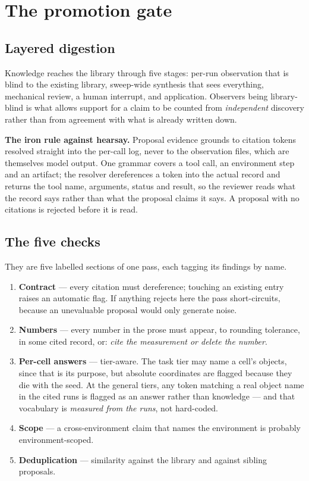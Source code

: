 \documentclass[11pt,a4paper]{report}
\newcommand{\keyrule}[1]{\textbf{\textcolor{acc}{#1}}}
\begin{document}
\chapter{The promotion gate}

\section{Layered digestion}

Knowledge reaches the library through five stages: per-run observation that is
blind to the existing library, sweep-wide synthesis that sees everything,
mechanical review, a human interrupt, and application. Observers being
library-blind is what allows support for a claim to be counted from
\emph{independent} discovery rather than from agreement with what is already
written down.

\keyrule{The iron rule against hearsay.} Proposal evidence grounds to citation
tokens resolved straight into the per-call log, never to the observation files,
which are themselves model output. One grammar covers a tool call, an
environment step and an artifact; the resolver dereferences a token into the
actual record and returns the tool name, arguments, status and result, so the
reviewer reads what the record says rather than what the proposal claims it
says. A proposal with no citations is rejected before it is read.

\section{The five checks}

They are five labelled sections of one pass, each tagging its findings by name.

\begin{enumerate}
\item \textbf{Contract} --- every citation must dereference; touching an
      existing entry raises an automatic flag. If anything rejects here the pass
      short-circuits, because an unevaluable proposal would only generate noise.
\item \textbf{Numbers} --- every number in the prose must appear, to rounding
      tolerance, in some cited record, or: \emph{cite the measurement or delete
      the number}.
\item \textbf{Per-cell answers} --- tier-aware. The task tier may name a cell's
      objects, since that is its purpose, but absolute coordinates are flagged
      because they die with the seed. At the general tiers, any token matching a
      real object name in the cited runs is flagged as an answer rather than
      knowledge --- and that vocabulary is \emph{measured from the runs}, not
      hard-coded.
\item \textbf{Scope} --- a cross-environment claim that names the environment is
      probably environment-scoped.
\item \textbf{Deduplication} --- similarity against the library and against
      sibling proposals.
\end{enumerate}
\end{document}
